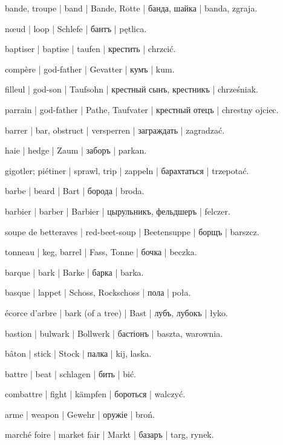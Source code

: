\begin{outdent}{1em}
bande, troupe | band | Bande, Rotte | банда, шайка | banda, zgraja.

nœud | loop | Schlefe | бантъ | pętlica.

baptiser | baptise | taufen | крестить | chrzcić.

\uvsubentry{}
compère | god-father | Gevatter | кумъ | kum.


\uvsubentry{}
filleul | god-son | Taufsohn | крестный сынъ, крестникъ | chrześniak.


\uvsubentry{}
parrain | god-father | Pathe, Taufvater | крестный отецъ | chrestny ojciec.

barrer | bar, obstruct | versperren | заграждать | zagradzać.

\uvsubentry{}
haie | hedge | Zaum | заборъ | parkan.

gigotler; piétiner | sprawl, trip | zappeln | барахтаться | trzepotać.

barbe | beard | Bart | борода | broda.

barbier | barber | Barbier | цырульникъ, фельдшеръ | felczer.

soupe de betteraves | red-beet-soup | Beetensuppe | борщъ | barszcz.

tonneau | keg, barrel | Fass, Tonne | бочка | beczka.

barque | bark | Barke | барка | barka.

basque | lappet | Schoss, Rockschoss | пола | poła.

écorce d’arbre | bark (of a tree) | Bast | лубъ, лубокъ | łyko.

bastion | bulwark | Bollwerk | бастіонъ | baszta, warownia.

bâton | stick | Stock | палка | kij, laska.

battre | beat | schlagen | бить | bić.

combattre | fight | kämpfen | бороться | walczyć.

\uvsubentry{}
arme | weapon | Gewehr | оружіе | broń.

marché foire | market fair | Markt | базаръ | targ, rynek.


\end{outdent}
